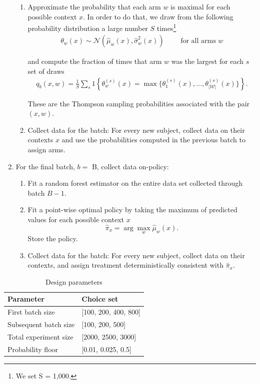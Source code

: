 \documentclass[letterpaper, 12pt, parskip=full,DIV=12]{scrartcl}
\begin{document}
\begin{enumerate}
\begin{enumerate}
  \item \label{step:prob} Approximate the probability that each arm $w$ is maximal for each possible context $x$. In order to do that, we draw from the following probability distribution a large number $S$ times\footnote{We set S = 1,000.}
  \begin{align*}
    \theta_{w}(x) \sim \mathcal{N}(\hat{\mu}_w(x), \hat{\sigma}_w^{2}(x)) \qquad %
    \text{ for all arms }w
  \end{align*}

  and compute the fraction of times that arm $w$ was the largest for each $s$ set of draws
  \begin{align*}
    q_{b}(x, w) = \frac{1}{S} \sum_{s} 1\left\{ \theta_{w}^{(s)}(x) = \max \{\theta_{1}^{(s)}(x), \dots, \theta_{|\mathcal{W}|}^{(s)}(x) \}  \right\}. 
  \end{align*}

  These are the Thompson sampling probabilities associated with the pair $(x, w)$. 
  
  \item Collect data for the batch: For every new subject, collect data on their contexts $x$ and use the probabilities computed in the previous batch to assign arms.
\end{enumerate}

\item For the final batch,  $b = $ B, collect data on-policy:
\begin{enumerate}
  \item Fit a random forest estimator on the entire data set collected through batch $B-1$.
  \item Fit a point-wise optimal policy  by taking the maximum of predicted values for each possible context $x$ 
    \begin{equation*}
     \hat{\pi}_{x} = \arg\max_{ w } \hat{\mu}_{w}(x) . 
    \end{equation*} 
  Store the policy. 
  \item Collect data for the batch: For every new subject, collect data on their contexts, and assign treatment deterministically consistent with $\hat{\pi}_{x}$. 
\end{enumerate}
\end{enumerate}


\begin{table}[H]
\centering
\caption{Design parameters}
\label{tab:design}
\begin{tabular}{l | l}
\textbf{Parameter} & \textbf{Choice set} \\ \hline
First batch size & [100, 200, 400, 800] \\
Subsequent batch size & [100, 200, 500] \\
Total experiment size & [2000, 2500, 3000] \\
Probability floor & [0.01, 0.025, 0.5]\\
\hline
\end{tabular}
\end{table}
\end{document}
